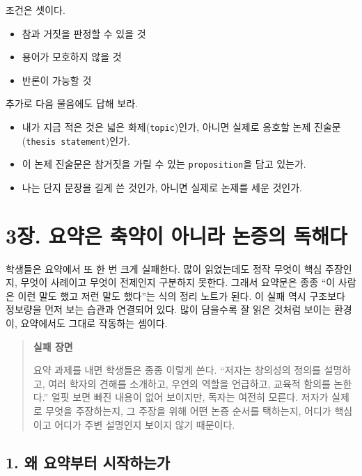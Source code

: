 조건은 셋이다.

\begin{itemize}
\tightlist
\item
  참과 거짓을 판정할 수 있을 것
\item
  용어가 모호하지 않을 것
\item
  반론이 가능할 것
\end{itemize}

추가로 다음 물음에도 답해 보라.

\begin{itemize}
\tightlist
\item
  내가 지금 적은 것은 넓은 화제(\texttt{topic})인가, 아니면 실제로 옹호할 논제 진술문(\texttt{thesis\ statement})인가.
\item
  이 논제 진술문은 참거짓을 가릴 수 있는 \texttt{proposition}을 담고 있는가.
\item
  나는 단지 문장을 길게 쓴 것인가, 아니면 실제로 논제를 세운 것인가.
\end{itemize}

\chapter{3장. 요약은 축약이 아니라 논증의 독해다}\label{3uxc7a5-uxc694uxc57duxc740-uxcd95uxc57duxc774-uxc544uxb2c8uxb77c-uxb17cuxc99duxc758-uxb3c5uxd574uxb2e4}

학생들은 요약에서 또 한 번 크게 실패한다. 많이 읽었는데도 정작 무엇이 핵심 주장인지, 무엇이 사례이고 무엇이 전제인지 구분하지 못한다. 그래서 요약문은 종종 ``이 사람은 이런 말도 했고 저런 말도 했다''는 식의 정리 노트가 된다. 이 실패 역시 구조보다 정보량을 먼저 보는 습관과 연결되어 있다. 많이 담을수록 잘 읽은 것처럼 보이는 환경이, 요약에서도 그대로 작동하는 셈이다.

\begin{quote}
\textbf{실패 장면}

요약 과제를 내면 학생들은 종종 이렇게 쓴다. ``저자는 창의성의 정의를 설명하고, 여러 학자의 견해를 소개하고, 우연의 역할을 언급하고, 교육적 함의를 논한다.'' 얼핏 보면 빠진 내용이 없어 보이지만, 독자는 여전히 모른다. 저자가 실제로 무엇을 주장하는지, 그 주장을 위해 어떤 논증 순서를 택하는지, 어디가 핵심이고 어디가 주변 설명인지 보이지 않기 때문이다.
\end{quote}

\section{1. 왜 요약부터 시작하는가}\label{1-uxc65c-uxc694uxc57duxbd80uxd130-uxc2dcuxc791uxd558uxb294uxac00}


